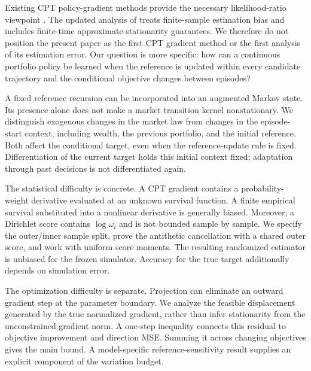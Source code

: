 \documentclass[11pt]{article}
\newcommand{\1}{\mathbf 1}
\theoremstyle{definition}
\begin{document}
Existing CPT policy-gradient methods provide the necessary likelihood-ratio viewpoint \citep{prashanth2016cumulative,jie2018stochastic,lepel2024policygradients}. The updated analysis of \citet{lepel2024policygradients} treats finite-sample estimation bias and includes finite-time approximate-stationarity guarantees. We therefore do not position the present paper as the first CPT gradient method or the first analysis of its estimation error. Our question is more specific: how can a continuous portfolio policy be learned when the reference is updated within every candidate trajectory and the conditional objective changes between episodes?

A fixed reference recursion can be incorporated into an augmented Markov state. Its presence alone does not make a market transition kernel nonstationary. We distinguish exogenous changes in the market law from changes in the episode-start context, including wealth, the previous portfolio, and the initial reference. Both affect the conditional target, even when the reference-update rule is fixed. Differentiation of the current target holds this initial context fixed; adaptation through past decisions is not differentiated again.

The statistical difficulty is concrete. A CPT gradient contains a probability-weight derivative evaluated at an unknown survival function. A finite empirical survival substituted into a nonlinear derivative is generally biased. Moreover, a Dirichlet score contains $\log\omega_i$ and is not bounded sample by sample. We specify the outer/inner sample split, prove the antithetic cancellation with a shared outer score, and work with uniform score moments. The resulting randomized estimator is unbiased for the frozen simulator. Accuracy for the true target additionally depends on simulation error.

The optimization difficulty is separate. Projection can eliminate an outward gradient step at the parameter boundary. We analyze the feasible displacement generated by the true normalized gradient, rather than infer stationarity from the unconstrained gradient norm. A one-step inequality connects this residual to objective improvement and direction MSE. Summing it across changing objectives gives the main bound. A model-specific reference-sensitivity result supplies an explicit component of the variation budget.
\end{document}
